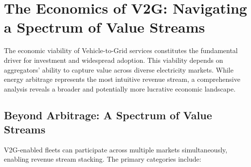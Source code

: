 \section{The Economics of V2G: Navigating a Spectrum of Value Streams}
\label{sec:v2g_economics}

The economic viability of Vehicle-to-Grid services constitutes the fundamental driver for investment and widespread adoption. This viability depends on aggregators' ability to capture value across diverse electricity markets. While energy arbitrage represents the most intuitive revenue stream, a comprehensive analysis reveals a broader and potentially more lucrative economic landscape.

\subsection{Beyond Arbitrage: A Spectrum of Value Streams}

V2G-enabled fleets can participate across multiple markets simultaneously, enabling revenue stream stacking. The primary categories include:

